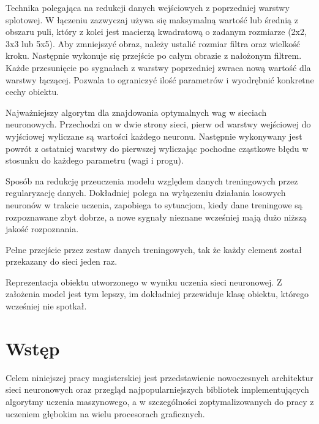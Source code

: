 \documentclass[12pt,a4paper,twoside,titlepage,openright]{book}
\begin{document}
\begin{description}[style=nextline]
	\item[Łączenie (ang. \textit{pooling})] Technika polegająca na redukcji danych wejściowych z poprzedniej warstwy splotowej. W łączeniu zazwyczaj używa się maksymalną wartość lub średnią z obszaru puli, który z kolei jest macierzą kwadratową o zadanym rozmiarze (2x2, 3x3 lub 5x5). Aby zmniejszyć obraz, należy ustalić rozmiar filtra oraz wielkość kroku. Następnie wykonuje się przejście po całym obrazie z nałożonym filtrem. Każde przesunięcie po sygnałach z warstwy poprzedniej zwraca nową wartość dla warstwy łączącej. Pozwala to ograniczyć ilość parametrów i wyodrębnić konkretne cechy obiektu.
	\item[Wsteczna propagacja błędu] Najważniejszy algorytm dla znajdowania optymalnych wag w sieciach neuronowych. Przechodzi on w dwie strony sieci, pierw od warstwy wejściowej do wyjściowej wyliczane są wartości każdego neuronu. Następnie wykonywany jest powrót z ostatniej warstwy do pierwszej wyliczając pochodne cząstkowe błędu w stosunku do każdego parametru (wagi i progu).	
	\item[Wyrzucanie połączeń (ang. \textit{dropout})] Sposób na redukcję przeuczenia modelu względem danych treningowych przez regularyzację danych. Dokładniej polega na wyłączeniu działania losowych neuronów w trakcie uczenia, zapobiega to sytuacjom, kiedy dane treningowe są rozpoznawane zbyt dobrze, a nowe sygnały nieznane wcześniej mają dużo niższą jakość rozpoznania.
	\item[Epoka] Pełne przejście przez zestaw danych treningowych, tak że każdy element został przekazany do sieci jeden raz.
	\item[Model] Reprezentacja obiektu utworzonego w wyniku uczenia sieci neuronowej. Z założenia model jest tym lepszy, im dokładniej przewiduje klasę obiektu, którego wcześniej nie spotkał.
\end{description}
 

\chapter*{Wstęp}
Celem niniejszej pracy magisterskiej jest przedstawienie nowoczesnych architektur sieci neuronowych oraz przegląd najpopularniejszych bibliotek implementujących algorytmy uczenia maszynowego, a w szczególności zoptymalizowanych do pracy z uczeniem głębokim na wielu procesorach graficznych. 
\end{document}

